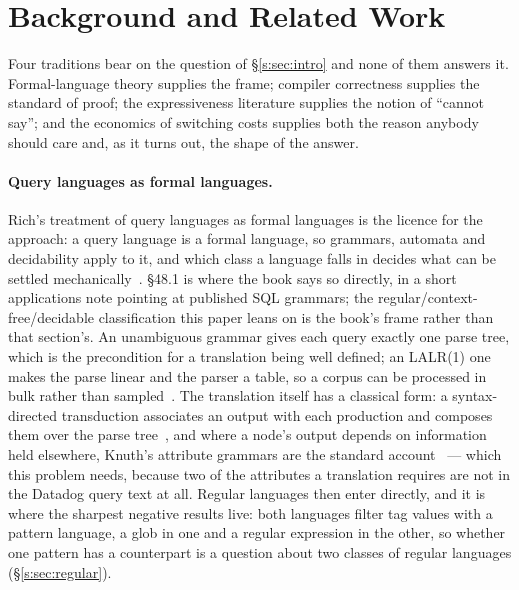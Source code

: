 
\section{Background and Related Work}
\label{s:sec:background}

Four traditions bear on the question of \S\ref{s:sec:intro} and none of them answers it.
Formal-language theory supplies the frame; compiler correctness supplies the standard of
proof; the expressiveness literature supplies the notion of ``cannot say''; and the
economics of switching costs supplies both the reason anybody should care and, as it turns
out, the shape of the answer.

\paragraph{Query languages as formal languages.}
Rich's treatment of query languages as formal languages is the licence for the approach: a
query language is a formal language, so grammars, automata and decidability apply to it,
and which class a language falls in decides what can be settled
mechanically~\citep{rich2008}. §48.1 is where the book says so directly, in a short
applications note pointing at published SQL grammars; the
regular/context-free/decidable classification this paper leans on is the book's frame
rather than that section's. An unambiguous grammar gives each query exactly one parse
tree, which is the precondition for a translation being well defined; an LALR(1) one makes
the parse linear and the parser a table, so a corpus can be processed in bulk rather than
sampled~\citep{aho2006}. The translation itself has a classical form: a syntax-directed
transduction associates an output with each production and composes them over the parse
tree~\citep{lewis1968}, and where a node's output depends on information held elsewhere,
Knuth's attribute grammars are the standard account~\citep{knuth1968} --- which this
problem needs, because two of the attributes a translation requires are not in the Datadog
query text at all. Regular languages then enter directly, and it is where the sharpest
negative results live: both languages filter tag values with a pattern language, a glob in
one and a regular expression in the other, so whether one pattern has a counterpart is a
question about two classes of regular languages (\S\ref{s:sec:regular}).

